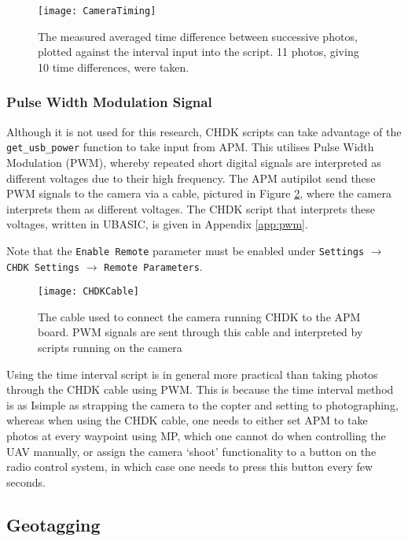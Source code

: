 \begin{figure}
    \centering
    \texttt{[image: CameraTiming]}
    \caption{The measured averaged time difference between successive photos,
        plotted against the interval input into the script. 11 photos, giving
        10 time differences, were taken.}
    \label{fig:camera-timing}
\end{figure}

\subsubsection{Pulse Width Modulation Signal}

Although it is not used for this research, CHDK scripts can take advantage of
the \texttt{get\_usb\_power} function to take input from APM. This utilises
Pulse Width Modulation (PWM), whereby repeated short digital signals are
interpreted as different voltages due to their high frequency. The APM autipilot
send these PWM signals to the camera via a cable, pictured in Figure
\ref{img:chdk-cable}, where the camera interprets them as different voltages.
The CHDK script that interprets these voltages, written in UBASIC, is given in
Appendix \ref{app:pwm}.

Note that the \texttt{Enable Remote} parameter must be enabled under
\texttt{Settings} $\rightarrow$ \texttt{CHDK Settings} $\rightarrow$
\texttt{Remote Parameters}.

\begin{figure}
    \centering
    \texttt{[image: CHDKCable]}
    \caption{The cable used to connect the camera running CHDK to the APM board.
        PWM signals are sent through this cable and interpreted by scripts
        running on the camera}
    \label{img:chdk-cable}
\end{figure}

Using the time interval script is in general more practical than taking photos
through the CHDK cable using PWM. This is because the time interval method is as
Isimple as strapping the camera to the copter and setting to photographing,
whereas when using the CHDK cable, one needs to either set APM to take photos at
every waypoint using MP, which one cannot do when controlling the UAV manually,
or assign the camera `shoot' functionality to a button on the radio control
system, in which case one needs to press this button every few seconds.

\subsection{Geotagging}
\label{sec:methods/geotagging}

